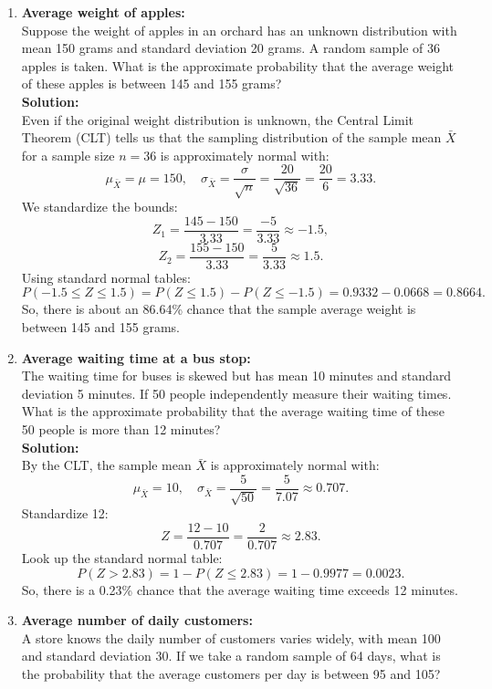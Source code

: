 \documentclass{book}
\begin{document}
\begin{enumerate}

    \item \textbf{Average weight of apples:} \\
    Suppose the weight of apples in an orchard has an unknown distribution with mean 150 grams and standard deviation 20 grams. A random sample of 36 apples is taken. What is the approximate probability that the average weight of these apples is between 145 and 155 grams? \\
    
    \textbf{Solution:} \\
    Even if the original weight distribution is unknown, the Central Limit Theorem (CLT) tells us that the sampling distribution of the sample mean \(\bar{X}\) for a sample size \(n=36\) is approximately normal with:
    \[
    \mu_{\bar{X}} = \mu = 150, \quad \sigma_{\bar{X}} = \frac{\sigma}{\sqrt{n}} = \frac{20}{\sqrt{36}} = \frac{20}{6} = 3.33.
    \]
    We standardize the bounds:
    \[
    Z_1 = \frac{145 - 150}{3.33} = \frac{-5}{3.33} \approx -1.5,
    \]
    \[
    Z_2 = \frac{155 - 150}{3.33} = \frac{5}{3.33} \approx 1.5.
    \]
    Using standard normal tables:
    \[
    P(-1.5 \leq Z \leq 1.5) = P(Z \leq 1.5) - P(Z \leq -1.5) = 0.9332 - 0.0668 = 0.8664.
    \]
    So, there is about an 86.64\% chance that the sample average weight is between 145 and 155 grams.

    \item \textbf{Average waiting time at a bus stop:} \\
    The waiting time for buses is skewed but has mean 10 minutes and standard deviation 5 minutes. If 50 people independently measure their waiting times. What is the approximate probability that the average waiting time of these 50 people is more than 12 minutes? \\
    
    \textbf{Solution:} \\
    By the CLT, the sample mean \(\bar{X}\) is approximately normal with:
    \[
    \mu_{\bar{X}} = 10, \quad \sigma_{\bar{X}} = \frac{5}{\sqrt{50}} = \frac{5}{7.07} \approx 0.707.
    \]
    Standardize 12:
    \[
    Z = \frac{12 - 10}{0.707} = \frac{2}{0.707} \approx 2.83.
    \]
    Look up the standard normal table:
    \[
    P(Z > 2.83) = 1 - P(Z \leq 2.83) = 1 - 0.9977 = 0.0023.
    \]
    So, there is a 0.23\% chance that the average waiting time exceeds 12 minutes.

    \item \textbf{Average number of daily customers:} \\
    A store knows the daily number of customers varies widely, with mean 100 and standard deviation 30. If we take a random sample of 64 days, what is the probability that the average customers per day is between 95 and 105? \\
    

\end{enumerate}
\end{document}
